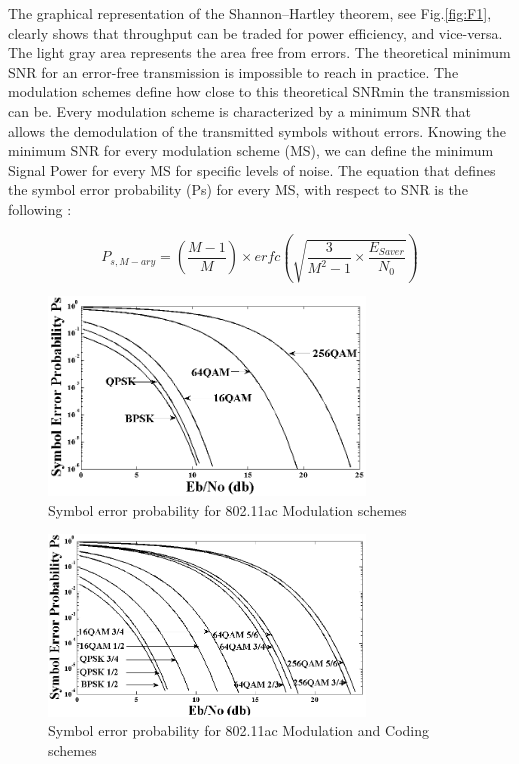 	The graphical representation of the Shannon–Hartley theorem, see Fig.\ref{fig:F1}, clearly shows that throughput can be traded for power efficiency, and vice-versa. The light gray area represents the area free from errors. The theoretical minimum SNR for an error-free transmission is impossible to reach in practice. The modulation schemes define how close to this theoretical SNRmin the transmission can be. Every modulation scheme is characterized by a minimum SNR that allows the demodulation of the transmitted symbols without errors. Knowing the minimum SNR for every modulation scheme (MS), we can define the minimum Signal Power for every MS for specific levels of noise. The equation that defines the symbol error probability (Ps) for every MS, with respect to SNR is the following \cite{7}:

\begin{equation}
P_{s,M-ary}= (\frac{M-1}{M}) \times erfc(\sqrt{\frac{3}{M^{2}-1} \times \frac{E_{Saver}}{N_{0}}})
\end{equation}

\begin{figure}
\centering
\includegraphics[width=0.75\textwidth]{F/image6.png}
\caption{Symbol error probability for 802.11ac Modulation schemes}
\label{fig:F2}
\end{figure}

\begin{figure}
\centering
\includegraphics[width=0.75\textwidth]{F/image7.png}
\caption{Symbol error probability for 802.11ac Modulation and Coding schemes}
\label{fig:F3}
\end{figure}

